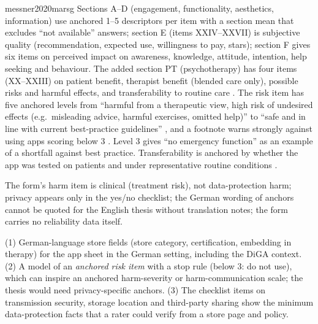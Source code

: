\begin{papercard}{messner2020marsg}
 Sections A--D (engagement, functionality, aesthetics, information) use anchored 1--5 descriptors per item with a section mean that excludes ``not available'' answers; section E (items XXIV--XXVII) is subjective quality (recommendation, expected use, willingness to pay, stars); section F gives six items on perceived impact on awareness, knowledge, attitude, intention, help seeking and behaviour. The added section PT (psychotherapy) has four items (XX--XXIII) on patient benefit, therapist benefit (blended care only), possible risks and harmful effects, and transferability to routine care . The risk item has five anchored levels from ``harmful from a therapeutic view, high risk of undesired effects (e.g.\ misleading advice, harmful exercises, omitted help)'' to ``safe and in line with current best-practice guidelines'' , and a footnote warns strongly against using apps scoring below 3 . Level 3 gives ``no emergency function'' as an example of a shortfall against best practice. Transferability is anchored by whether the app was tested on patients and under representative routine conditions .

 The form's harm item is clinical (treatment risk), not data-protection harm; privacy appears only in the yes/no checklist; the German wording of anchors cannot be quoted for the English thesis without translation notes; the form carries no reliability data itself.

 (1) German-language store fields (store category, certification, embedding in therapy) for the app sheet in the German setting, including the DiGA context. (2) A model of an \emph{anchored risk item} with a stop rule (below 3: do not use), which can inspire an anchored harm-severity or harm-communication scale; the thesis would need privacy-specific anchors. (3) The checklist items on transmission security, storage location and third-party sharing show the minimum data-protection facts that a rater could verify from a store page and policy.
\end{papercard}
